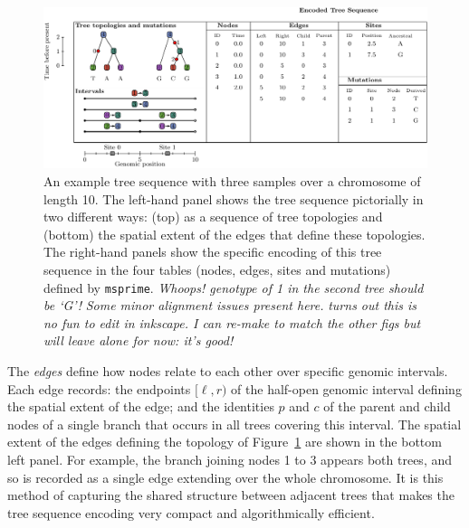 \documentclass{article}
\newcommand{\msprime}{\texttt{msprime}}
\newcommand{\plr}[1]{{\em \color{blue} #1}}
\newcommand{\jk}[1]{{\em \color{red} #1}}
\begin{document}
\begin{figure}
    \begin{center}
        \includegraphics[width=\textwidth]{example_tree_sequence}
    \end{center}
    \caption{
        An example tree sequence with three samples over a chromosome of length 10.
        The left-hand panel shows the tree sequence pictorially in two different ways:
        (top) as a sequence of tree topologies
        and (bottom) the spatial extent of the edges that define these topologies.
        The right-hand panels show the specific encoding
        of this tree sequence in the four tables (nodes, edges, sites and mutations)
        defined by \msprime.
        \plr{Whoops!  genotype of 1 in the second tree should be `G'!}
        \jk{Some minor alignment issues present here.}
        \plr{turns out this is no fun to edit in inkscape.
            I can re-make to match the other figs
            but will leave alone for now: it's good!}
        \label{fig:example_tree_sequence}
    }
\end{figure}

The \emph{edges} define how nodes relate to each other over specific genomic intervals.
Each edge records:
the endpoints $[\ell, r)$ of the half-open genomic interval defining the
spatial extent of the edge;
and the identities $p$ and $c$ of the parent and child nodes
of a single branch that occurs in all trees covering this interval.
The spatial extent of the edges defining the topology of Figure~\ref{fig:example_tree_sequence}
are shown in the bottom left panel.
For example, the branch joining nodes 1 to 3 appears both trees,
and so is recorded as a single edge extending over the whole chromosome.
It is this method of capturing the shared structure between adjacent trees that makes the
tree sequence encoding very compact and algorithmically efficient.
\end{document}
